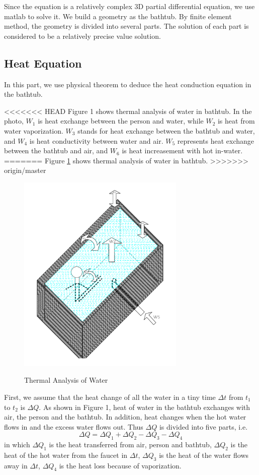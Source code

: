 \documentclass[12pt,a4paper,titlepage]{article}
\begin{document}
Since the equation is a relatively complex 3D partial differential equation, we use matlab to solve it.
We build a geometry as the bathtub. By finite element method, the geometry is divided into several parts.
The solution of each part is considered to be a relatively precise value solution.



\subsection{Heat Equation}
\label{sec:heat equation}

In this part, we use physical theorem to deduce the heat conduction equation in the bathtub.

<<<<<<< HEAD
Figure 1 shows thermal analysis of water in bathtub.
In the photo, $W_1$ is heat exchange between the person and water, while $W_2$ is heat from water vaporization. $W_3$ stands for heat exchange between the bathtub and water, and $W_4$ is heat conductivity between water and air. $W_5$ represents heat exchange between the bathtub and air, and $W_6$ is heat increasement with hot in-water.
=======
Figure \ref{1_p} shows thermal analysis of water in bathtub.
>>>>>>> origin/master
\begin{figure}[htb]
  \centering
  \includegraphics[width=8cm]{2.pdf}\\
  \caption{Thermal Analysis of Water}\label{1_p}
\end{figure}

First, we assume that the heat change of all the water in a tiny time $\Delta t$ from $t_1$ to $t_2$ is $\Delta Q$.
As shown in Figure 1, heat of water in the bathtub exchanges with air, the person and the bathtub.
In addition, heat changes when the hot water flows in and the excess water flows out.
Thus $\Delta Q$ is divided into five parts, i.e.
\begin{equation}
 \Delta Q=\Delta Q_1+\Delta Q_2-\Delta Q_3-\Delta Q_4
\end{equation}
in which $\Delta Q_1$ is the heat transferred from air, person and bathtub,
$\Delta Q_2$ is the heat of the hot water from the faucet in $\Delta t$,
$\Delta Q_3$ is the heat of the water flows away in $\Delta t$,
$\Delta Q_4$ is the heat loss because of vaporization.
\end{document}
